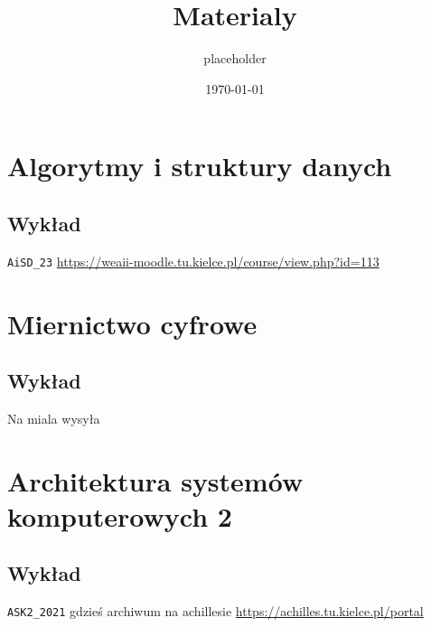 \documentclass[11pt]{article}
\author{placeholder}
\date{\today}
\title{Materialy}
\begin{document}
\maketitle
\tableofcontents

\section{Algorytmy i struktury danych}
\label{sec:org4a4a7c0}
\subsection{Wykład}
\label{sec:orgbf08f88}
\texttt{AiSD\_23}
\url{https://weaii-moodle.tu.kielce.pl/course/view.php?id=113}
\section{Miernictwo cyfrowe}
\label{sec:orgb475637}
\subsection{Wykład}
\label{sec:orgd4db75b}
Na miala wysyła
\section{Architektura systemów komputerowych 2}
\label{sec:org77d4a59}
\subsection{Wykład}
\label{sec:org73ad763}
\texttt{ASK2\_2021} gdzieś archiwum na achillesie \url{https://achilles.tu.kielce.pl/portal}
\end{document}

